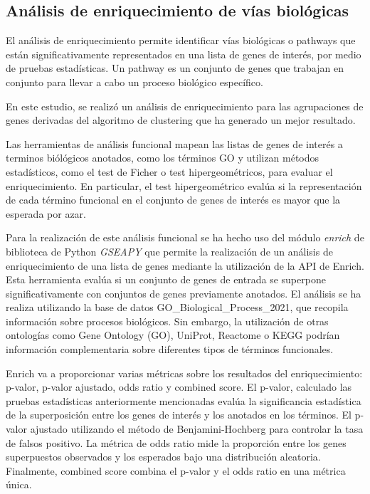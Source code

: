 \subsection{Análisis de enriquecimiento de vías biológicas}

El análisis de enriquecimiento permite identificar vías biológicas o pathways que están significativamente representados en una lista de genes de interés, por medio de pruebas estadísticas. Un pathway es un conjunto de genes que trabajan en conjunto para llevar a cabo un proceso biológico específico.\cite{Reimand2019}

En este estudio, se realizó un análisis de enriquecimiento para las agrupaciones de genes derivadas del algoritmo de clustering que ha generado un mejor resultado.

Las herramientas de análisis funcional mapean las listas de genes de interés a terminos biólógicos anotados, como los términos GO y utilizan métodos estadísticos, como el test de Ficher o test hipergeométricos,
para evaluar el enriquecimiento\cite{10.1093/nar/gkn923}. En particular, el test hipergeométrico evalúa si la representación de cada término funcional en el conjunto de genes de interés 
es mayor que la esperada por azar. 


Para la realización de este análisis funcional se ha hecho uso del módulo \textit{enrich} de biblioteca de Python \textit{GSEAPY} que permite la realización de un 
análisis de enriquecimiento de una lista de genes mediante la utilización de la API de Enrich. Esta herramienta evalúa si un conjunto de genes de entrada se superpone significativamente con conjuntos de genes previamente anotados. 
El análisis se ha realiza utilizando la base de datos  GO\_Biological\_Process\_2021, que recopila información sobre procesos biológicos. Sin embargo, la utilización de otras ontologías como 
Gene Ontology (GO), UniProt, Reactome o KEGG podrían  información complementaria sobre diferentes tipos de términos funcionales.

Enrich va a proporcionar varias métricas sobre los resultados del enriquecimiento: p-valor, p-valor ajustado, odds ratio y combined score.
El p-valor, calculado las pruebas estadísticas anteriormente mencionadas evalúa la significancia estadística de la superposición entre los genes de interés y los anotados en los términos. El p-valor ajustado
utilizando el método de Benjamini-Hochberg para controlar la tasa de falsos positivo. La métrica de odds ratio mide la proporción entre los genes superpuestos observados y los esperados bajo una distribución aleatoria.
Finalmente, combined score combina el p-valor y el odds ratio en una métrica única. \cite{maayanlab_enrichr_help}

